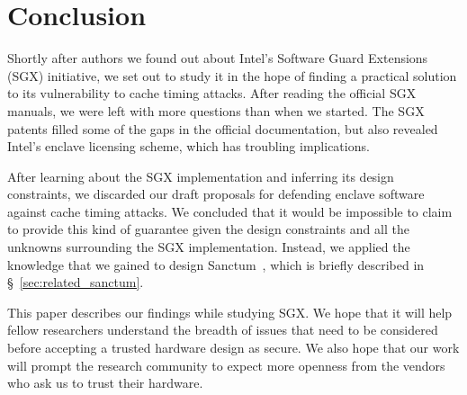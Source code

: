 \section{Conclusion}

Shortly after authors we found out about Intel's Software Guard Extensions
(SGX) initiative, we set out to study it in the hope of finding a practical
solution to its vulnerability to cache timing attacks. After reading the
official SGX manuals, we were left with more questions than when we started.
The SGX patents filled some of the gaps in the official documentation, but also
revealed Intel's enclave licensing scheme, which has troubling implications.

After learning about the SGX implementation and inferring its design
constraints, we discarded our draft proposals for defending enclave software
against cache timing attacks. We concluded that it would be impossible to claim
to provide this kind of guarantee given the design constraints and all the
unknowns surrounding the SGX implementation. Instead, we applied the knowledge
that we gained to design Sanctum~\cite{costan2015sanctum}, which is briefly
described in \S~\ref{sec:related_sanctum}.

This paper describes our findings while studying SGX. We hope that it will help
fellow researchers understand the breadth of issues that need to be considered
before accepting a trusted hardware design as secure. We also hope that our
work will prompt the research community to expect more openness from the
vendors who ask us to trust their hardware.
